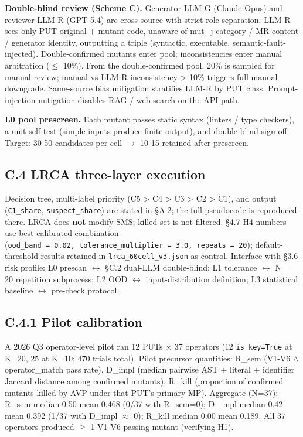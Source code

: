 \documentclass[manuscript,screen,review]{acmart}
\begin{document}
\textbf{Double-blind review (Scheme C).} Generator LLM-G (Claude Opus)
and reviewer LLM-R (GPT-5.4) are cross-source with strict role
separation. LLM-R sees only PUT original + mutant code, unaware of
mut\_j category / MR content / generator identity, outputting a triple
(syntactic, executable, semantic-fault-injected). Double-confirmed
mutants enter pool; inconsistencies enter manual arbitration ($\leq$ 10\%).
From the double-confirmed pool, 20\% is sampled for manual review;
manual-vs-LLM-R inconsistency \textgreater{} 10\% triggers full manual
downgrade. Same-source bias mitigation stratifies LLM-R by PUT class.
Prompt-injection mitigation disables RAG / web search on the API path.

\textbf{L0 pool prescreen.} Each mutant passes static syntax (linters /
type checkers), a unit self-test (simple inputs produce finite output),
and double-blind sign-off. Target: 30-50 candidates per cell $\to$ 10-15
retained after prescreen.

\subsection{C.4 LRCA three-layer execution}\label{c.4-lrca-three-layer-execution-full}

Decision tree, multi-label priority (C5 \textgreater{} C4 \textgreater{}
C3 \textgreater{} C2 \textgreater{} C1), and output (\texttt{C1\_share},
\texttt{suspect\_share}) are stated in §A.2; the full pseudocode is
reproduced there. LRCA does \textbf{not} modify SMS; killed set is not
filtered. §4.7 H4 numbers use best calibrated combination
(\texttt{ood\_band\ =\ 0.02,\ tolerance\_multiplier\ =\ 3.0,\ repeats\ =\ 20});
default-threshold results retained in \texttt{lrca\_60cell\_v3.json} as
control. Interface with §3.6 risk profile: L0 prescan $\leftrightarrow$ §C.2 dual-LLM
double-blind; L1 tolerance $\leftrightarrow$ N = 20 repetition subprocess; L2 OOD $\leftrightarrow$
input-distribution definition; L3 statistical baseline $\leftrightarrow$ pre-check
protocol.

\subsection{C.4.1 Pilot calibration}\label{c.4.1-pilot-calibration-37-operators-k-1020}

A 2026 Q3 operator-level pilot ran 12 PUTs $\times$ 37 operators (12
\texttt{is\_key=True} at K=20, 25 at K=10; 470 trials total). Pilot
precursor quantities: R\_sem (V1-V6 $\wedge$ operator\_match pass rate),
D\_impl (median pairwise AST + literal + identifier Jaccard distance
among confirmed mutants), R\_kill (proportion of confirmed mutants
killed by AVP under that PUT's primary MP). Aggregate (N=37): R\_sem
median 0.50 mean 0.468 (0/37 with R\_sem=0); D\_impl median 0.42 mean
0.392 (1/37 with D\_impl $\approx$ 0); R\_kill median 0.00 mean 0.189. All 37
operators produced $\geq$ 1 V1-V6 passing mutant (verifying H1).
\end{document}
